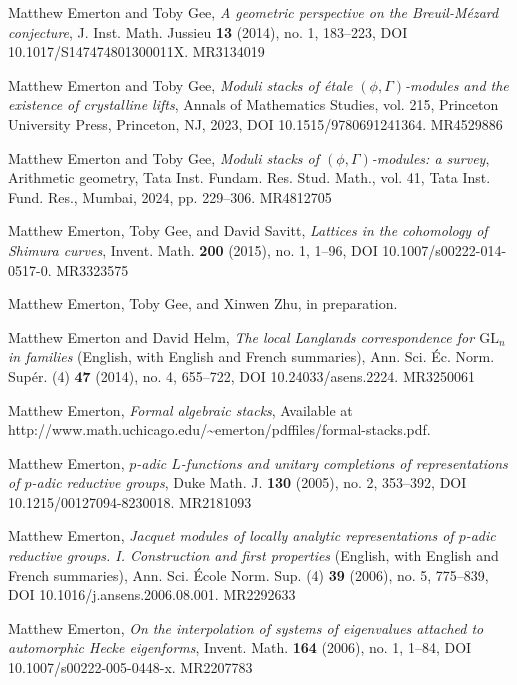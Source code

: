 \item[{[EG14]}] Matthew Emerton and Toby Gee, \emph{A geometric perspective on the Breuil-M\'ezard conjecture}, J. Inst. Math. Jussieu \textbf{13} (2014), no. 1, 183--223, DOI 10.1017/S147474801300011X. MR3134019
\item[{[EG23]}] Matthew Emerton and Toby Gee, \emph{Moduli stacks of \'etale $(\phi,\Gamma)$-modules and the existence of crystalline lifts}, Annals of Mathematics Studies, vol. 215, Princeton University Press, Princeton, NJ, 2023, DOI 10.1515/9780691241364. MR4529886
\item[{[EG24]}] Matthew Emerton and Toby Gee, \emph{Moduli stacks of $(\phi,\Gamma)$-modules: a survey}, Arithmetic geometry, Tata Inst. Fundam. Res. Stud. Math., vol. 41, Tata Inst. Fund. Res., Mumbai, 2024, pp. 229--306. MR4812705
\item[{[EGS15]}] Matthew Emerton, Toby Gee, and David Savitt, \emph{Lattices in the cohomology of Shimura curves}, Invent. Math. \textbf{200} (2015), no. 1, 1--96, DOI 10.1007/s00222-014-0517-0. MR3323575
\item[{[EGZ]}] Matthew Emerton, Toby Gee, and Xinwen Zhu, in preparation.
\item[{[EH14]}] Matthew Emerton and David Helm, \emph{The local Langlands correspondence for $\mathrm{GL}_n$ in families} (English, with English and French summaries), Ann. Sci. \'Ec. Norm. Sup\'er. (4) \textbf{47} (2014), no. 4, 655--722, DOI 10.24033/asens.2224. MR3250061
\item[{[Eme]}] Matthew Emerton, \emph{Formal algebraic stacks}, Available at http://www.math.uchicago.edu/\textasciitilde emerton/pdffiles/formal-stacks.pdf.
\item[{[Eme05]}] Matthew Emerton, \emph{$p$-adic $L$-functions and unitary completions of representations of $p$-adic reductive groups}, Duke Math. J. \textbf{130} (2005), no. 2, 353--392, DOI 10.1215/00127094-8230018. MR2181093
\item[{[Eme06a]}] Matthew Emerton, \emph{Jacquet modules of locally analytic representations of $p$-adic reductive groups. I. Construction and first properties} (English, with English and French summaries), Ann. Sci. \'Ecole Norm. Sup. (4) \textbf{39} (2006), no. 5, 775--839, DOI 10.1016/j.ansens.2006.08.001. MR2292633
\item[{[Eme06b]}] Matthew Emerton, \emph{On the interpolation of systems of eigenvalues attached to automorphic Hecke eigenforms}, Invent. Math. \textbf{164} (2006), no. 1, 1--84, DOI 10.1007/s00222-005-0448-x. MR2207783
